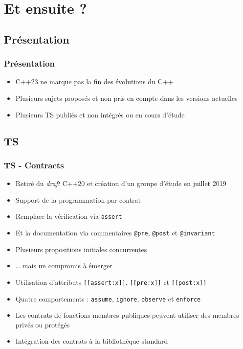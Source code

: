 \documentclass[C++.tex]{subfiles}
\begin{document}
\section{Et ensuite ?}
\subsection*{Présentation}
\begin{frame}[fragile]
	\frametitle{Présentation}
	\begin{itemize}
		\item C++23 ne marque pas la fin des évolutions du C++
		\item Plusieurs sujets proposés et non pris en compte dans les versions actuelles
		\item Plusieurs TS publiés et non intégrés ou en cours d'étude
	\end{itemize}
\end{frame}

\subsection*{TS}
\begin{frame}[fragile]
	\frametitle{TS - Contracts}
	\begin{itemize}
		\item Retiré du \textit{draft} C++20 et création d'un groupe d'étude en juillet 2019
		\item Support de la programmation par contrat
		\item Remplace la vérification via \lstinline|assert| 
		\item Et la documentation via commentaires \lstinline|@pre|, \lstinline|@post| et \lstinline|@invariant|
		\item Plusieurs propositions initiales concurrentes
		\item \ldots{} mais un compromis à émerger
		\item Utilisation d'attributs \lstinline|[[assert:x]]|, \lstinline|[[pre:x]]| et \lstinline|[[post:x]]|
		\item Quatre comportements : \lstinline|assume|, \lstinline|ignore|, \lstinline|observe| et \lstinline|enforce|
		\item Les contrats de fonctions membres publiques peuvent utiliser des membres privés ou protégés
		\item Intégration des contrats à la bibliothèque standard
	\end{itemize}
\end{frame}
\end{document}
